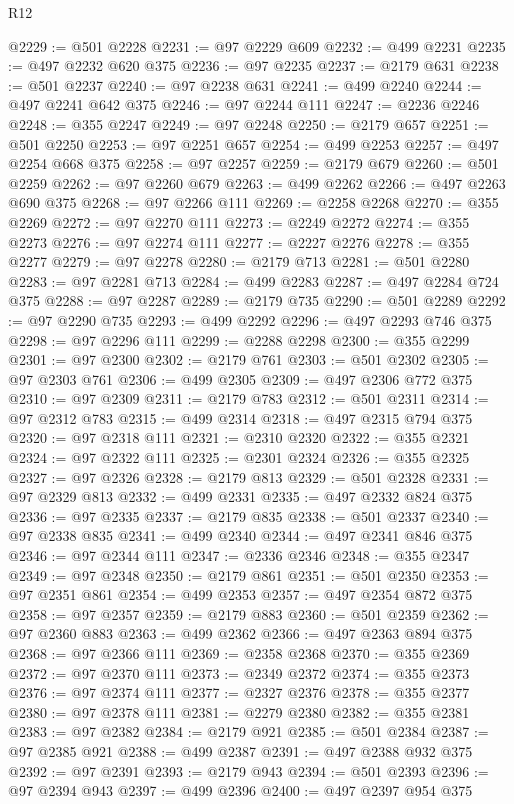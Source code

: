 \begin{lexlean}{R12}
\begin{coremodule}
@2229 := @501 @2228
@2231 := @97 @2229 @609
@2232 := @499 @2231
@2235 := @497 @2232 @620 @375
@2236 := @97 @2235
@2237 := @2179 @631
@2238 := @501 @2237
@2240 := @97 @2238 @631
@2241 := @499 @2240
@2244 := @497 @2241 @642 @375
@2246 := @97 @2244 @111
@2247 := @2236 @2246
@2248 := @355 @2247
@2249 := @97 @2248
@2250 := @2179 @657
@2251 := @501 @2250
@2253 := @97 @2251 @657
@2254 := @499 @2253
@2257 := @497 @2254 @668 @375
@2258 := @97 @2257
@2259 := @2179 @679
@2260 := @501 @2259
@2262 := @97 @2260 @679
@2263 := @499 @2262
@2266 := @497 @2263 @690 @375
@2268 := @97 @2266 @111
@2269 := @2258 @2268
@2270 := @355 @2269
@2272 := @97 @2270 @111
@2273 := @2249 @2272
@2274 := @355 @2273
@2276 := @97 @2274 @111
@2277 := @2227 @2276
@2278 := @355 @2277
@2279 := @97 @2278
@2280 := @2179 @713
@2281 := @501 @2280
@2283 := @97 @2281 @713
@2284 := @499 @2283
@2287 := @497 @2284 @724 @375
@2288 := @97 @2287
@2289 := @2179 @735
@2290 := @501 @2289
@2292 := @97 @2290 @735
@2293 := @499 @2292
@2296 := @497 @2293 @746 @375
@2298 := @97 @2296 @111
@2299 := @2288 @2298
@2300 := @355 @2299
@2301 := @97 @2300
@2302 := @2179 @761
@2303 := @501 @2302
@2305 := @97 @2303 @761
@2306 := @499 @2305
@2309 := @497 @2306 @772 @375
@2310 := @97 @2309
@2311 := @2179 @783
@2312 := @501 @2311
@2314 := @97 @2312 @783
@2315 := @499 @2314
@2318 := @497 @2315 @794 @375
@2320 := @97 @2318 @111
@2321 := @2310 @2320
@2322 := @355 @2321
@2324 := @97 @2322 @111
@2325 := @2301 @2324
@2326 := @355 @2325
@2327 := @97 @2326
@2328 := @2179 @813
@2329 := @501 @2328
@2331 := @97 @2329 @813
@2332 := @499 @2331
@2335 := @497 @2332 @824 @375
@2336 := @97 @2335
@2337 := @2179 @835
@2338 := @501 @2337
@2340 := @97 @2338 @835
@2341 := @499 @2340
@2344 := @497 @2341 @846 @375
@2346 := @97 @2344 @111
@2347 := @2336 @2346
@2348 := @355 @2347
@2349 := @97 @2348
@2350 := @2179 @861
@2351 := @501 @2350
@2353 := @97 @2351 @861
@2354 := @499 @2353
@2357 := @497 @2354 @872 @375
@2358 := @97 @2357
@2359 := @2179 @883
@2360 := @501 @2359
@2362 := @97 @2360 @883
@2363 := @499 @2362
@2366 := @497 @2363 @894 @375
@2368 := @97 @2366 @111
@2369 := @2358 @2368
@2370 := @355 @2369
@2372 := @97 @2370 @111
@2373 := @2349 @2372
@2374 := @355 @2373
@2376 := @97 @2374 @111
@2377 := @2327 @2376
@2378 := @355 @2377
@2380 := @97 @2378 @111
@2381 := @2279 @2380
@2382 := @355 @2381
@2383 := @97 @2382
@2384 := @2179 @921
@2385 := @501 @2384
@2387 := @97 @2385 @921
@2388 := @499 @2387
@2391 := @497 @2388 @932 @375
@2392 := @97 @2391
@2393 := @2179 @943
@2394 := @501 @2393
@2396 := @97 @2394 @943
@2397 := @499 @2396
@2400 := @497 @2397 @954 @375

\end{coremodule}
\end{lexlean}
